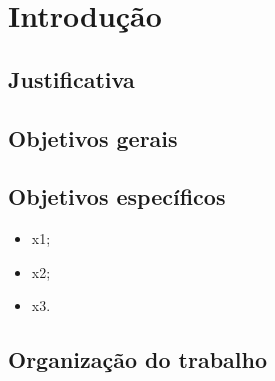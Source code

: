 \chapter{Introdução} \label{ch:Introdução}




\section{Justificativa}



\section{Objetivos gerais}


\section{Objetivos específicos}

\begin{itemize}
	\item x1;
    \item x2;
    \item x3.
\end{itemize}

\section{Organização do trabalho}

